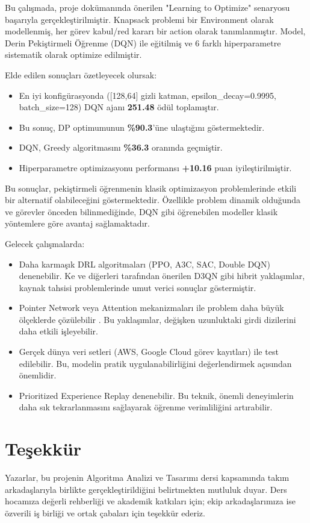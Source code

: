 \documentclass[onecolumn]{IEEEtran}
\begin{document}
Bu çalışmada, proje dokümanında önerilen "Learning to Optimize" senaryosu başarıyla gerçekleştirilmiştir. Knapsack problemi bir Environment olarak modellenmiş, her görev kabul/red kararı bir action olarak tanımlanmıştır. Model, Derin Pekiştirmeli Öğrenme (DQN) ile eğitilmiş ve 6 farklı hiperparametre sistematik olarak optimize edilmiştir.

Elde edilen sonuçları özetleyecek olursak:

\begin{itemize}
\item En iyi konfigürasyonda ([128,64] gizli katman, epsilon\_decay=0.9995, batch\_size=128) DQN ajanı \textbf{251.48} ödül toplamıştır.
\item Bu sonuç, DP optimumunun \textbf{\%90.3}'üne ulaştığını göstermektedir.
\item DQN, Greedy algoritmasını \textbf{\%36.3} oranında geçmiştir.
\item Hiperparametre optimizasyonu performansı \textbf{+10.16} puan iyileştirilmiştir.
\end{itemize}

Bu sonuçlar, pekiştirmeli öğrenmenin klasik optimizasyon problemlerinde etkili bir alternatif olabileceğini göstermektedir. Özellikle problem dinamik olduğunda ve görevler önceden bilinmediğinde, DQN gibi öğrenebilen modeller klasik yöntemlere göre avantaj sağlamaktadır.

Gelecek çalışmalarda:

\begin{itemize}
\item Daha karmaşık DRL algoritmaları (PPO, A3C, SAC, Double DQN) denenebilir. Ke ve diğerleri \cite{ke2025hybrid} tarafından önerilen D3QN gibi hibrit yaklaşımlar, kaynak tahsisi problemlerinde umut verici sonuçlar göstermiştir.
\item Pointer Network veya Attention mekanizmaları ile problem daha büyük ölçeklerde çözülebilir \cite{bello2016neural}. Bu yaklaşımlar, değişken uzunluktaki girdi dizilerini daha etkili işleyebilir.
\item Gerçek dünya veri setleri (AWS, Google Cloud görev kayıtları) ile test edilebilir. Bu, modelin pratik uygulanabilirliğini değerlendirmek açısından önemlidir.
\item Prioritized Experience Replay \cite{schaul2015prioritized} denenebilir. Bu teknik, önemli deneyimlerin daha sık tekrarlanmasını sağlayarak öğrenme verimliliğini artırabilir.
\end{itemize}

\section*{Teşekkür}

Yazarlar, bu projenin Algoritma Analizi ve Tasarımı dersi kapsamında takım arkadaşlarıyla birlikte gerçekleştirildiğini belirtmekten mutluluk duyar. Ders hocamıza değerli rehberliği ve akademik katkıları için; ekip arkadaşlarımıza ise özverili iş birliği ve ortak çabaları için teşekkür ederiz.




\end{document}

